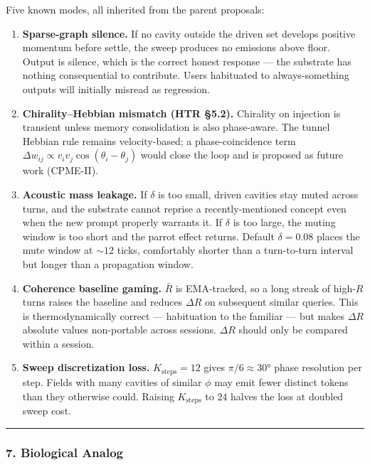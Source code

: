 \documentclass[
  11pt,
  a4paper,
]{article}
\begin{document}
Five known modes, all inherited from the parent proposals:

\begin{enumerate}
\def\labelenumi{\arabic{enumi}.}
\item
  \textbf{Sparse-graph silence.} If no cavity outside the driven set
  develops positive momentum before settle, the sweep produces no
  emissions above floor. Output is silence, which is the correct honest
  response --- the substrate has nothing consequential to contribute.
  Users habituated to always-something outputs will initially misread as
  regression.
\item
  \textbf{Chirality--Hebbian mismatch (HTR §5.2).} Chirality on
  injection is transient unless memory consolidation is also
  phase-aware. The tunnel Hebbian rule remains velocity-based; a
  phase-coincidence term
  \(\Delta w_{ij} \propto v_i v_j \cos(\theta_i - \theta_j)\) would
  close the loop and is proposed as future work (CPME-II).
\item
  \textbf{Acoustic mass leakage.} If \(\delta\) is too small, driven
  cavities stay muted across turns, and the substrate cannot reprise a
  recently-mentioned concept even when the new prompt properly warrants
  it. If \(\delta\) is too large, the muting window is too short and the
  parrot effect returns. Default \(\delta = 0.08\) places the mute
  window at \(\sim 12\) ticks, comfortably shorter than a turn-to-turn
  interval but longer than a propagation window.
\item
  \textbf{Coherence baseline gaming.} \(\bar R\) is EMA-tracked, so a
  long streak of high-\(R\) turns raises the baseline and reduces
  \(\Delta R\) on subsequent similar queries. This is thermodynamically
  correct --- habituation to the familiar --- but makes \(\Delta R\)
  absolute values non-portable across sessions. \(\Delta R\) should only
  be compared within a session.
\item
  \textbf{Sweep discretization loss.} \(K_{\text{steps}} = 12\) gives
  \(\pi/6 \approx 30°\) phase resolution per step. Fields with many
  cavities of similar \(\phi\) may emit fewer distinct tokens than they
  otherwise could. Raising \(K_{\text{steps}}\) to \(24\) halves the
  loss at doubled sweep cost.
\end{enumerate}

\begin{center}\rule{0.5\linewidth}{0.5pt}\end{center}

\subsubsection{7. Biological Analog}\label{biological-analog}
\end{document}

